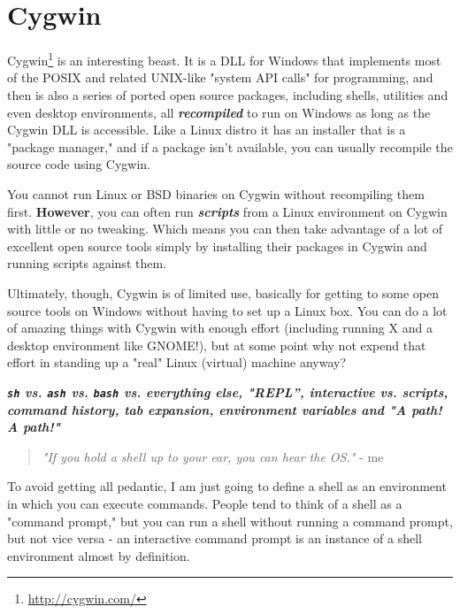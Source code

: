 \documentclass[10pt,]{book}
\renewcommand{\href}[2]{#2\footnote{\url{#1}}}
\numberwithin{figure}{chapter}
\DeclareRobustCommand{\drios}[1]{\index{OS and OS-Like Substances!#1}}
\begin{document}
\section*{Cygwin}\label{cygwin}

\href{http://cygwin.com/}{Cygwin}\drios{Cygwin} is an interesting beast.
It is a DLL for Windows that implements most of the POSIX and related
UNIX-like "system API calls" for programming, and then is also a series
of ported open source packages, including shells, utilities and even
desktop environments, all \textbf{\emph{recompiled}} to run on Windows
as long as the Cygwin DLL is accessible. Like a Linux distro it has an
installer that is a "package manager," and if a package isn't available,
you can usually recompile the source code using Cygwin.

You cannot run Linux or BSD binaries on Cygwin without recompiling them
first. \textbf{However}, you can often run \textbf{\emph{scripts}} from
a Linux environment on Cygwin with little or no tweaking. Which means
you can then take advantage of a lot of excellent open source tools
simply by installing their packages in Cygwin and running scripts
against them.

Ultimately, though, Cygwin is of limited use, basically for getting to
some open source tools on Windows without having to set up a Linux box.
You can do a lot of amazing things with Cygwin with enough effort
(including running X and a desktop environment like GNOME!), but at some
point why not expend that effort in standing up a "real" Linux (virtual)
machine anyway?


\textbf{\emph{\texttt{sh} vs. \texttt{ash} vs. \texttt{bash} vs.
everything else, "REPL”, interactive vs. scripts, command history, tab
expansion, environment variables and "A path! A path!"}}

\begin{quote}
\emph{"If you hold a shell up to your ear, you can hear the OS."} - me
\end{quote}

To avoid getting all pedantic, I am just going to define a shell as an
environment in which you can execute commands. People tend to think of a
shell as a "command prompt," but you can run a shell without running a
command prompt, but not vice versa - an interactive command prompt is an
instance of a shell environment almost by definition.
\end{document}
